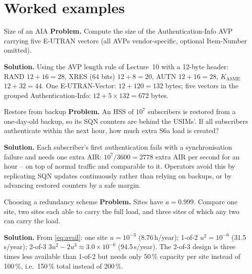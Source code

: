 \documentclass[11pt,a4paper]{article}
\begin{document}
\begin{acnfigure}
  \caption{Sequence-number re-synchronisation (\cref{proc:resync}).}
  \label{fig:resync}
\end{acnfigure}

\section{Worked examples}

\begin{examplebox}{Size of an AIA}\label{ex:aia}
\textbf{Problem.} Compute the size of the Authentication-Info AVP carrying five E-UTRAN vectors (all AVPs
vendor-specific, optional Item-Number omitted).

\textbf{Solution.} Using the AVP length rule of Lecture~10 with a 12-byte header: RAND $12+16 = 28$, XRES (64
bits) $12+8 = 20$, AUTN $12+16 = 28$, $K_{\mathrm{ASME}}$ $12+32 = 44$. One E-UTRAN-Vector: $12 + 120 = 132$
bytes; five vectors in the grouped Authentication-Info: $12 + 5\times132 = 672$ bytes.
\end{examplebox}

\begin{examplebox}{Restore from backup}\label{ex:resync}
\textbf{Problem.} An HSS of $10^7$ subscribers is restored from a one-day-old backup, so its SQN counters
are behind the USIMs'. If all subscribers authenticate within the next hour, how much extra S6a load is
created?

\textbf{Solution.} Each subscriber's first authentication fails with a synchronisation failure and needs
one extra AIR: $10^7/3600 = 2778$ extra AIR per second for an hour -- on top of normal traffic and
comparable to it. Operators avoid this by replicating SQN updates continuously rather than relying on
backups, or by advancing restored counters by a safe margin.
\end{examplebox}

\begin{examplebox}{Choosing a redundancy scheme}\label{ex:geo}
\textbf{Problem.} Sites have $a = 0.999$. Compare one site, two sites each able to carry the full load,
and three sites of which any two can carry the load.

\textbf{Solution.} From \cref{eq:avail}: one site $u = 10^{-3}$ (8.76\,h/year); 1-of-2 $u^2 = 10^{-6}$
(31.5\,s/year); 2-of-3 $3u^2-2u^3 \approx 3.0\times10^{-6}$ (94.5\,s/year). The 2-of-3 design is three
times less available than 1-of-2 but needs only 50\,\% capacity per site instead of 100\,\%, i.e.\ 150\,\%
total instead of 200\,\%.
\end{examplebox}
\end{document}
